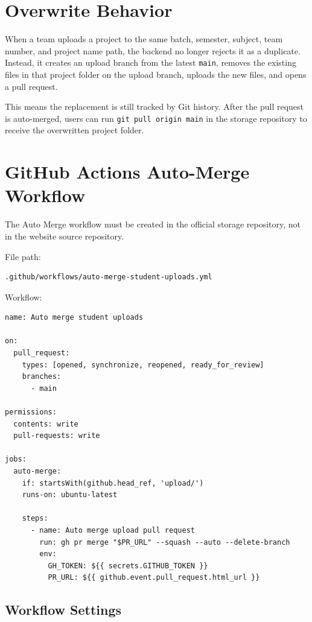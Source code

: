 \documentclass[12pt,a4paper]{article}
\begin{document}
\section{Overwrite Behavior}

When a team uploads a project to the same batch, semester, subject, team number, and project name path, the backend no longer rejects it as a duplicate. Instead, it creates an upload branch from the latest \texttt{main}, removes the existing files in that project folder on the upload branch, uploads the new files, and opens a pull request.

This means the replacement is still tracked by Git history. After the pull request is auto-merged, users can run \texttt{git pull origin main} in the storage repository to receive the overwritten project folder.

\section{GitHub Actions Auto-Merge Workflow}

The Auto Merge workflow must be created in the official storage repository, not in the website source repository.

File path:

\begin{lstlisting}
.github/workflows/auto-merge-student-uploads.yml
\end{lstlisting}

Workflow:

\begin{lstlisting}
name: Auto merge student uploads

on:
  pull_request:
    types: [opened, synchronize, reopened, ready_for_review]
    branches:
      - main

permissions:
  contents: write
  pull-requests: write

jobs:
  auto-merge:
    if: startsWith(github.head_ref, 'upload/')
    runs-on: ubuntu-latest

    steps:
      - name: Auto merge upload pull request
        run: gh pr merge "$PR_URL" --squash --auto --delete-branch
        env:
          GH_TOKEN: ${{ secrets.GITHUB_TOKEN }}
          PR_URL: ${{ github.event.pull_request.html_url }}
\end{lstlisting}

\subsection{Workflow Settings}
\end{document}
